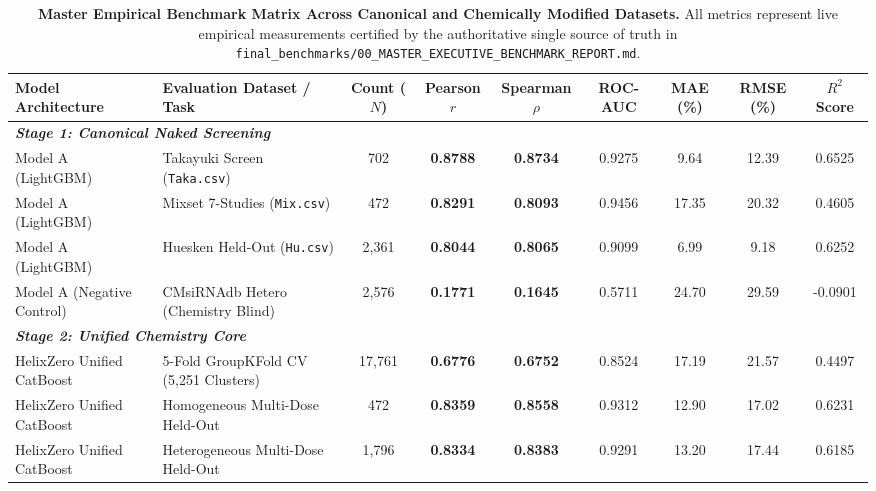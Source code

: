 \documentclass[twocolumn]{article}
\begin{document}
\begin{table}[t]
\centering
\small
\caption{\textbf{Master Empirical Benchmark Matrix Across Canonical and Chemically Modified Datasets.} All metrics represent live empirical measurements certified by the authoritative single source of truth in \texttt{final\_benchmarks/00\_MASTER\_EXECUTIVE\_BENCHMARK\_REPORT.md}.}
\vspace{0.5em}
\begin{tabular}{llccccccc}
\toprule
\textbf{Model Architecture} & \textbf{Evaluation Dataset / Task} & \textbf{Count ($N$)} & \textbf{Pearson $r$} & \textbf{Spearman $\rho$} & \textbf{ROC-AUC} & \textbf{MAE (\%)} & \textbf{RMSE (\%)} & \textbf{$R^2$ Score} \\
\midrule
\multicolumn{9}{l}{\textit{\textbf{Stage 1: Canonical Naked Screening}}} \\
Model A (LightGBM) & Takayuki Screen (\texttt{Taka.csv}) & 702 & \textbf{0.8788} & \textbf{0.8734} & 0.9275 & 9.64 & 12.39 & 0.6525 \\
Model A (LightGBM) & Mixset 7-Studies (\texttt{Mix.csv}) & 472 & \textbf{0.8291} & \textbf{0.8093} & 0.9456 & 17.35 & 20.32 & 0.4605 \\
Model A (LightGBM) & Huesken Held-Out (\texttt{Hu.csv}) & 2,361 & \textbf{0.8044} & \textbf{0.8065} & 0.9099 & 6.99 & 9.18 & 0.6252 \\
Model A (Negative Control) & CMsiRNAdb Hetero (Chemistry Blind) & 2,576 & \textbf{0.1771} & \textbf{0.1645} & 0.5711 & 24.70 & 29.59 & -0.0901 \\
\midrule
\multicolumn{9}{l}{\textit{\textbf{Stage 2: Unified Chemistry Core}}} \\
HelixZero Unified CatBoost & 5-Fold GroupKFold CV (5,251 Clusters) & 17,761 & \textbf{0.6776} & \textbf{0.6752} & 0.8524 & 17.19 & 21.57 & 0.4497 \\
HelixZero Unified CatBoost & Homogeneous Multi-Dose Held-Out & 472 & \textbf{0.8359} & \textbf{0.8558} & 0.9312 & 12.90 & 17.02 & 0.6231 \\
HelixZero Unified CatBoost & Heterogeneous Multi-Dose Held-Out & 1,796 & \textbf{0.8334} & \textbf{0.8383} & 0.9291 & 13.20 & 17.44 & 0.6185 \\
\bottomrule
\end{tabular}
\end{table}
\end{document}
